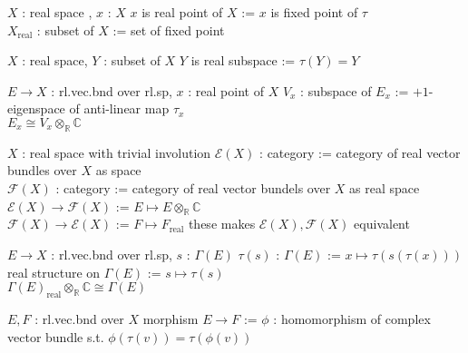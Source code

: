 \documentclass[dvipdfmx]{jsarticle}
\begin{document}
\begin{Definition}
\itemwhen
  \For \(X\) : real space , \(x\) : \(X\)
\itemdefi
  \Define \(x\) is real point of \(X\) := \(x\) is fixed point of \(\tau\) \\
  \Define \(X_{\text{real}}\) : subset of \(X\) := set of fixed point
\end{Definition}

\begin{Definition}
\itemwhen
  \For \(X\) : real space, \(Y\) : subset of \(X\)
\itemdefi
  \Define \(Y\) is real subspace := \(\tau(Y) = Y\)
\end{Definition}

\begin{Theorem}
\itemwhen
  \For \(E \to X\) : rl.vec.bnd over rl.sp, \(x\) : real point of \(X\)
\itemprop
  \Let \(V_{x}\) : subspace of \(E_{x}\) := \(+1\)-eigenspace of anti-linear map \(\tau_{x}\) \\
  \Then \(E_{x} \cong V_{x} \otimes_{\mathbb{R}} \mathbb{C}\)
\end{Theorem}

\begin{Theorem}
\itemwhen
  \For \(X\) : real space with trivial involution 
\itemdefi
  \Define \(\mathcal{E}(X)\) : category := category of real vector bundles over \(X\) as space \\
  \Define \(\mathcal{F}(X)\) : category := category of real vector bundels over \(X\) as real space \\
  \Let \(\mathcal{E}(X) \to \mathcal{F}(X)\) := \(E \mapsto E \otimes_{\mathbb{R}} \mathbb{C}\) \\
  \Let \(\mathcal{F}(X) \to \mathcal{E}(X)\) := \(F \mapsto F_{\text{real}}\)
\itemprop
  \Then these makes \(\mathcal{E}(X), \mathcal{F}(X)\) equivalent
\end{Theorem}

\begin{Theorem}
\itemwhen
  \For \(E \to X\) : rl.vec.bnd over rl.sp, \(s\) : \(\Gamma(E)\)
\itemdefi
  \Define \(\tau(s)\) : \(\Gamma(E)\) := \(x \mapsto \tau(s(\tau(x)))\) \\
  \Define real structure on \(\Gamma(E)\) := \(s \mapsto \tau(s)\) \\
  \Then \(\Gamma(E)_{\text{real}} \otimes_{\mathbb{R}} \mathbb{C} \cong \Gamma(E)\)
\end{Theorem}

\begin{Definition}
\itemwhen
  \For \(E,F\) : rl.vec.bnd over \(X\)
\itemdefi
  \Define morphism \(E \to F\) := \(\phi\) : homomorphism of complex vector bundle s.t. \(\phi(\tau(v)) = \tau(\phi(v))\)
\end{Definition}
\end{document}
